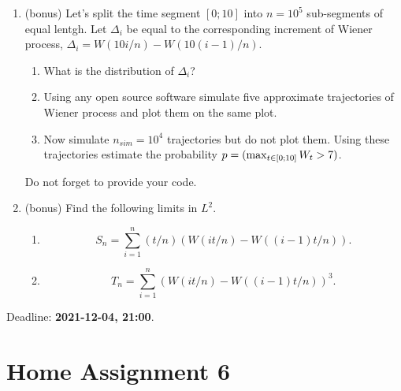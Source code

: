 \documentclass[12pt]{article}
\let\P\relax
\DeclareMathOperator{\P}{\mathbb{P}}
\begin{document}
\begin{enumerate}
  \item (bonus) Let's split the time segment $[0;10]$ into $n=10^5$ sub-segments of equal lentgh. 
 Let $\Delta_i$ be equal to the corresponding increment of Wiener process, 
 $\Delta_i = W(10i/n) - W(10(i-1)/n)$. 
  \begin{enumerate}
    \item What is the distribution of $\Delta_i$?
    \item Using any open source software simulate five approximate trajectories of Wiener process and plot them 
    on the same plot. 
    \item Now simulate $n_{sim} = 10^4$ trajectories but do not plot them. 
    Using these trajectories estimate the probability $p = \P(\max_{t \in [0;10]}W_t > 7)$. 
  \end{enumerate}
  
  Do not forget to provide your code. 

  \item (bonus) Find the following limits in $L^2$.
  \begin{enumerate}
    \item 
    \[
    S_n = \sum_{i=1}^n (t/n)\left(W(it/n) - W((i-1)t/n)\right).
    \]
    \item 
    \[
      T_n = \sum_{i=1}^n \left(W(it/n) - W((i-1)t/n)\right)^3.
    \]
  
  \end{enumerate}
  

\end{enumerate}


Deadline: \textbf{2021-12-04, 21:00}. 






\newpage

\section*{Home Assignment 6}
\end{document}
